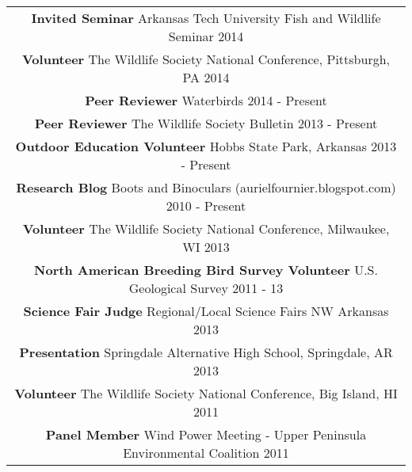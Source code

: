 \documentclass[letterpaper,11pt]{article}
\begin{document}
	\begin{center}\begin{tabular*}{6.9in}{l@{\extracolsep{\fill}}r}
\multicolumn{2}{c}{{\bf Invited Seminar} Arkansas Tech University Fish and Wildlife Seminar \cftdotfill{\cftdotsep} 2014}\\

\multicolumn{2}{c}{{\bf Volunteer} The Wildlife Society National Conference, Pittsburgh, PA \cftdotfill{\cftdotsep} 2014}\\
	
\multicolumn{2}{c}{{\bf Peer Reviewer} Waterbirds \cftdotfill{\cftdotsep} 2014 - Present}\\
	
\multicolumn{2}{c}{{\bf Peer Reviewer} The Wildlife Society Bulletin \cftdotfill{\cftdotsep} 2013 - Present}\\


\multicolumn{2}{c}{{\bf Outdoor Education Volunteer} Hobbs State Park, Arkansas \cftdotfill{\cftdotsep} 2013 - Present}\\

\multicolumn{2}{c}{{\bf Research Blog} Boots and Binoculars (aurielfournier.blogspot.com) \cftdotfill{\cftdotsep} 2010 - Present}\\

\multicolumn{2}{c}{{\bf Volunteer} The Wildlife Society National Conference, Milwaukee, WI \cftdotfill{\cftdotsep} 2013}\\

\multicolumn{2}{c}{{\bf North American Breeding Bird Survey Volunteer} U.S. Geological Survey \cftdotfill{\cftdotsep} 2011 - 13}\\

\multicolumn{2}{c}{{\bf Science Fair Judge} Regional/Local Science Fairs NW Arkansas \cftdotfill{\cftdotsep}2013}\\

\multicolumn{2}{c}{{\bf Presentation} Springdale Alternative High School, Springdale, AR \cftdotfill{\cftdotsep}2013}\\

\multicolumn{2}{c}{{\bf Volunteer} The Wildlife Society National Conference, Big Island, HI  \cftdotfill{\cftdotsep}2011}\\

\multicolumn{2}{c}{{\bf Panel Member} Wind Power Meeting - Upper Peninsula Environmental Coalition  \cftdotfill{\cftdotsep}2011}\\


\end{tabular*}
\end{center}
\end{document}
